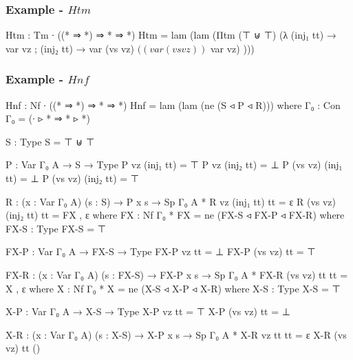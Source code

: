 \subsubsection*{Example - $Htm$}\label{Htm}

\begin{code}
Htm : Tm ∙ ((* ⇒ *) ⇒ * ⇒ *)
Htm = lam (lam (Πtm (⊤ ⊎ ⊤) (λ
  { (inj₁ tt) → var vz
  ; (inj₂ tt) → var (vs vz) $ ((var (vs vz)) $ var vz)
  })))
\end{code}

\subsubsection*{Example - $Hnf$}\label{Hnf}

\begin{code}
Hnf : Nf ∙ ((* ⇒ *) ⇒ * ⇒ *)
Hnf = lam (lam (ne (S ◃ P ◃ R)))
  where
  Γ₀ : Con
  Γ₀ = (∙ ▹ * ⇒ * ▹ *)

  S : Type
  S = ⊤ ⊎ ⊤

  P : Var Γ₀ A → S → Type
  P vz (inj₁ tt) = ⊤
  P vz (inj₂ tt) = ⊥
  P (vs vz) (inj₁ tt) = ⊥
  P (vs vz) (inj₂ tt) = ⊤

  R : (x : Var Γ₀ A) (s : S) → P x s → Sp Γ₀ A *
  R vz (inj₁ tt) tt = ε
  R (vs vz) (inj₂ tt) tt = FX , ε
    where
    FX : Nf Γ₀ *
    FX = ne (FX-S ◃ FX-P ◃ FX-R)
      where
      FX-S : Type
      FX-S = ⊤

      FX-P : Var Γ₀ A → FX-S → Type
      FX-P vz tt = ⊥
      FX-P (vs vz) tt = ⊤

      FX-R : (x : Var Γ₀ A) (s : FX-S) → FX-P x s → Sp Γ₀ A *
      FX-R (vs vz) tt tt = X , ε
        where
        X : Nf Γ₀ *
        X = ne (X-S ◃ X-P ◃ X-R)
          where
          X-S : Type
          X-S = ⊤

          X-P : Var Γ₀ A → X-S → Type
          X-P vz tt = ⊤
          X-P (vs vz) tt = ⊥

          X-R : (x : Var Γ₀ A) (s : X-S) → X-P x s → Sp Γ₀ A *
          X-R vz tt tt = ε
          X-R (vs vz) tt ()
\end{code}